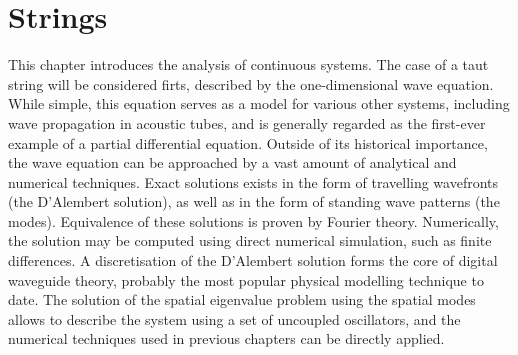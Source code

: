 \newcommand{\dif}{\mathop{}\!\mathrm{d}}
\newcommand{\al}{\alpha}
\newcommand{\bt}{\beta}
\newcommand{\om}{\omega}
\newcommand{\gm}{\gamma}
\newcommand{\lb}{\lambda}
\newcommand{\lm}{\lambda_-}
\newcommand{\lp}{\lambda_+}
\newcommand{\thw}{\theta_w}
\newcommand{\thp}{\theta_\phi}
\newcommand{\tht}{\theta}

\newcommand{\etp}{e_{t+}}
\newcommand{\etm}{e_{t-}}

\newcommand{\esp}{e_{x+}}
\newcommand{\esm}{e_{x-}}

\newcommand{\dsp}{\delta_{x+}}
\newcommand{\dsm}{\delta_{x-}}
\newcommand{\dsd}{\delta_{x\cdot}}
\newcommand{\dss}{\delta_{xx}}
\newcommand{\dssss}{\delta_{xxxx}}

\newcommand{\dtp}{\delta_{t+}}
\newcommand{\dtm}{\delta_{t-}}
\newcommand{\dtd}{\delta_{t\cdot}}
\newcommand{\dtt}{\delta_{tt}}
\newcommand{\dtttt}{\delta_{tttt}}
\newcommand{\dspm}{\delta_{x\pm}}

\newcommand{\mtp}{\mu_{t+}}
\newcommand{\mtm}{\mu_{t-}}
\newcommand{\mtd}{\mu_{t\cdot}}
\newcommand{\mtt}{\mu_{tt}}

\newcommand{\norm}[1]{\left\|#1\right\|}
\newcommand{\innp}[1]{\left\langle#1\right\rangle}
\newcommand{\virg}[1]{``#1''}

\chapter{Strings}


This chapter introduces the analysis of continuous systems. The case of a taut string will be considered firts, described by the one-dimensional wave equation. While simple, this equation serves as a model for various other systems, including wave propagation in acoustic tubes, and is generally regarded as the first-ever example of a partial differential equation. Outside of its historical importance, the wave equation can be approached by a vast amount of analytical and numerical techniques. Exact solutions exists in the form of travelling wavefronts (the D'Alembert solution), as well as in the form of standing wave patterns (the modes). Equivalence of these solutions is proven by Fourier theory. Numerically, the solution may be computed using direct numerical simulation, such as finite differences. A discretisation of the D'Alembert solution forms the core of digital waveguide theory, probably the most popular physical modelling technique to date. The solution of the spatial eigenvalue problem using the spatial modes allows to describe the system using a set of uncoupled oscillators, and the numerical techniques used in previous chapters can be directly applied. 


